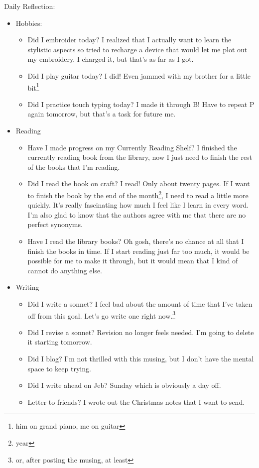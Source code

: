 \documentclass[12pt]{article}[titlepage]
\newcommand{\1}{\={a}}
\newcommand{\2}{\={e}}
\newcommand{\3}{\={\i}}
\newcommand{\4}{\=o}
\newcommand{\5}{\=u}
\newcommand{\6}{\={A}}
\renewcommand{\,}{\textsuperscript{,}}
\begin{document}
Daily Reflection:
\begin{itemize}
\item Hobbies:
\begin{itemize}
\item Did I embroider today? I realized that I actually want to learn the stylistic aspects so tried to recharge a device that would let me plot out my embroidery.
I charged it, but that's as far as I got.
\item Did I play guitar today? I did! Even jammed with my brother for a little bit\footnote{him on grand piano, me on guitar}
\item Did I practice touch typing today? I made it through B! Have to repeat P again tomorrow, but that's a task for future me.
\end{itemize}
\item Reading
\begin{itemize}
\item Have I made progress on my Currently Reading Shelf? I finished the currently reading book from the library, now I just need to finish the rest of the books that I'm reading.
\item Did I read the book on craft? I read! Only about twenty pages. If I want to finish the book by the end of the month\footnote{year}, I need to read a little more quickly. It's really fascinating how much I feel like I learn in every word.
I'm also glad to know that the authors agree with me that there are no perfect synonyms.
\item Have I read the library books? Oh gosh, there's no chance at all that I finish the books in time. If I start reading just far too much, it would be possible for me to make it through, but it would mean that I kind of cannot do anything else.
\end{itemize}
\item Writing
\begin{itemize}
\item Did I write a sonnet? I feel bad about the amount of time that I've taken off from this goal. Let's go write one right now.\footnote{or, after posting the musing, at least}
\item Did I revise a sonnet? Revision no longer feels needed. I'm going to delete it starting tomorrow.
\item Did I blog? I'm not thrilled with this musing, but I don't have the mental space to keep trying.
\item Did I write ahead on Jeb? Sunday which is obviously a day off.
\item Letter to friends? I wrote out the Christmas notes that I want to send.

\end{itemize}
\end{itemize}
\end{document}
